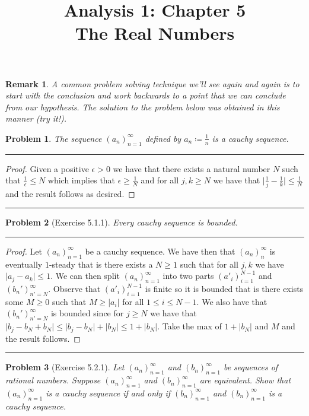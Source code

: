 \documentclass{article}
\title{\huge Analysis 1: Chapter 5 \\ \LARGE {The Real Numbers}}
\date{}
\newcommand{\lined}{\noindent\rule{\textwidth}{1pt}}
\newtheorem*{problem}{Problem}
\newtheorem*{remark}{Remark}
\begin{document}
	\maketitle
	
	\begin{remark}
		A common problem solving technique we'll see again and again is to start with the conclusion and work backwards to a point that we can conclude from our hypothesis. The solution to the problem below was obtained in this manner (try it!).
	\end{remark}
	
	\begin{problem}
		The sequence $(a_n)_{n = 1}^{\infty}$ defined by $a_n \coloneqq \frac{1}{n}$ is a cauchy sequence.
	\end{problem}
	
	\lined
		\begin{proof}
			Given a positive $\epsilon > 0$ we have that there exists a natural number $N$ such that $\frac{1}{\epsilon} \leq N$ which implies that $\epsilon \geq \frac{1}{N}$ and for all $j,k \geq N$ we have that $\lvert \frac{1}{j} - \frac{1}{k}\rvert \leq \frac{1}{N}$ and the result follows as desired.
		\end{proof}
	\lined
	
	\newpage
	
	\begin{problem}[Exercise 5.1.1]
		Every cauchy sequence is bounded.
	\end{problem}
	
	\lined
		\begin{proof}
		 Let $(a_n)_{n = 1}^{\infty}$ be a cauchy sequence. We have then that 	$(a_n)_{n}^{\infty}$ is eventually $1$-steady that is there exists 
		 a $N \geq 1$ such that for all $j,k$ we have $\lvert a_j - a_k \rvert\leq 1$. We can then split $(a_n)_{n = 1}^{\infty}$ into two parts $(a'_i)_{i = 1}^{N - 1}$ and $(b_n')_{n' = N}^{\infty}$. Observe that $(a'_i)_{i = 1}^{N - 1}$ is finite so it is bounded that is there exists some $M \geq 0$ such that $M \geq \lvert a_i \rvert$
for all $1 \leq i \leq N - 1$.  We also have that $(b_n')_{n' = N}^{\infty}$ is bounded since for $j \geq N$ we have that $\lvert b_j - b_N + b_N \rvert \leq  \lvert b_j - b_N \rvert + \lvert b_N \rvert \leq 1 + \lvert b_N \rvert$. Take the max of $1 + \lvert b_N \rvert$ and $M$ and the result follows.
		\end{proof}
	\lined
	
	\newpage
	
	
	\begin{problem}[Exercise 5.2.1]
		Let $(a_n)_{n = 1}^{\infty}$ and  $(b_n)_{n = 1}^{\infty}$ be sequences of rational numbers. Suppose $(a_n)_{n = 1}^{\infty}$ and  $(b_n)_{n = 1}^{\infty}$ are equivalent. Show that $(a_n)_{n = 1}^{\infty}$ is a cauchy sequence if and only if $(b_n)_{n = 1}^{\infty}$ and  $(b_n)_{n = 1}^{\infty}$ is a cauchy sequence.
	\end{problem}
	
\end{document}
